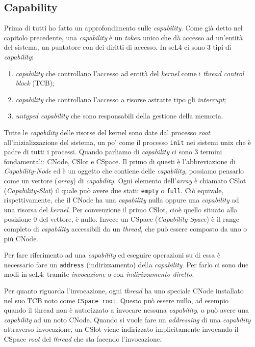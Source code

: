 \subsection{Capability}
Prima di tutti ho fatto un approfondimento sulle \textit{capability}. Come già detto nel capitolo precedente, una \textit{capability} è un \textit{token} unico che dà accesso ad un'entità del sistema, un puntatore con dei diritti di accesso. In seL4 ci sono 3 tipi di \textit{capability}:
\begin{enumerate}
	\item \textit{capability} che controllano l'accesso ad entità del \textit{kernel} come i \textit{thread control block} (TCB);
	\item \textit{capability} che controllano l'accesso a risorse astratte tipo gli \textit{interrupt};
	\item \textit{untyped capability} che sono responsabili della gestione della memoria.
\end{enumerate}

Tutte le \textit{capability} delle risorse del kernel sono date dal processo \textit{root} all'inizializzazione del sistema, un po' come il processo \texttt{init} nei sistemi unix che è padre di tutti i processi. Quando parliamo di \textit{capability} ci sono 3 termini fondamentali: CNode, CSlot e CSpace. Il primo di questi è l'abbreviazione di \textit{Capability-Node} ed è un oggetto che contiene delle \textit{capability}, possiamo pensarlo come un vettore (\textit{array}) di \textit{capability}. Ogni elemento dell'\textit{array} è chiamato CSlot (\textit{Capability-Slot}) il quale può avere due stati: \texttt{empty} o \texttt{full}. Ciò equivale, rispettivamente, che il CNode ha una \textit{capability} nulla oppure una \textit{capability} ad una risorsa del \textit{kernel}. Per convenzione il primo CSlot, cioè quello situato alla posizione 0 del vettore, è nullo. Invece un CSpace (\textit{Capability-Space}) è il range completo di \textit{capability} accessibili da un \textit{thread}, che può essere composto da uno o più CNode.

Per fare riferimento ad una \textit{capability} ed eseguire operazioni su di essa è necessario fare un \texttt{address} (indirizzamento) della \textit{capability}. Per farlo ci sono due modi in seL4: tramite \textit{invocazione} o con \textit{indirizzamento diretto}.

Per quanto riguarda l'invocazione, ogni \textit{thread} ha uno speciale CNode installato nel suo TCB noto come \texttt{CSpace root}. Questo può essere nullo, ad esempio quando il thread non è autorizzato a invocare nessuna \textit{capability}, o può avere una \textit{capability} ad un noto CNode. Quando si vuole fare un \textit{addressing} di una \textit{capability} attraverso invocazione, un CSlot viene indirizzato implicitamente invocando il CSpace \textit{root} del \textit{thread} che sta facendo l'invocazione.

